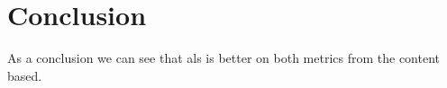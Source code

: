 \newpage
\section{Conclusion}
As a conclusion we can see that als is better on both metrics from the content based.